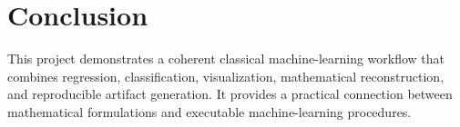 \documentclass[11pt]{article}
\begin{document}
\section{Conclusion}
This project demonstrates a coherent classical machine-learning workflow that combines
regression, classification, visualization, mathematical reconstruction, and reproducible
artifact generation. It provides a practical connection between mathematical formulations
and executable machine-learning procedures.
\end{document}

